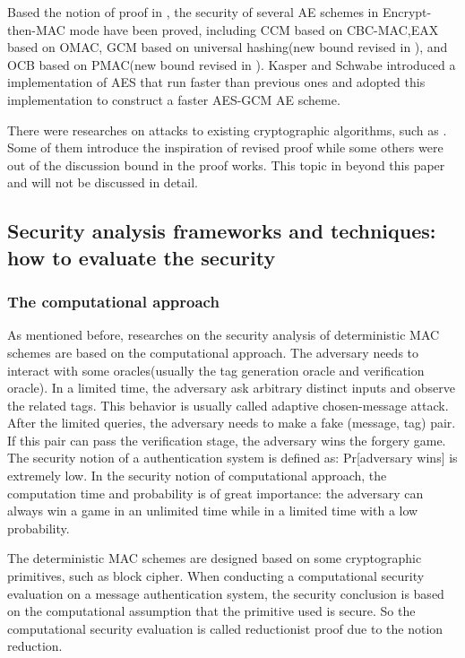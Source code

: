 \documentclass{article}
\begin{document}
Based the notion of proof in \cite{aead}, the security of several AE schemes in
Encrypt-then-MAC mode have been proved, including CCM \cite{ccm}based on
CBC-MAC,EAX\cite{eax} based on OMAC, GCM
\cite{gcm} based on universal hashing(new bound revised in \cite{breaking}), and
OCB\cite{ocb} based on PMAC(new bound revised in \cite{tweak,iPMAC}). Kasper and
Schwabe introduced a implementation of AES that run faster than previous ones
and adopted this implementation to construct a faster AES-GCM AE
scheme\cite{fast}.

There were researches on attacks to existing cryptographic algorithms, such as
\cite{cycle,attack_blk,hardware_attack}. Some of them introduce the inspiration of revised proof while
some others were out of the discussion bound in the proof works. This topic in
beyond this paper and will not be discussed in detail.

\subsection{Security analysis frameworks and techniques: how to evaluate the security}
\subsubsection{The computational approach}
As mentioned before, researches on the security analysis of deterministic MAC schemes are based on the computational approach.
The adversary needs to interact with some oracles(usually the tag generation oracle and verification oracle). In a limited time, the adversary ask arbitrary distinct inputs and observe the related tags. This behavior is usually called adaptive chosen-message attack. After the limited queries, the adversary needs to make a fake (message, tag) pair. If this pair can pass the verification stage, the adversary wins the forgery game. The security notion of a authentication system is defined as: Pr[adversary wins] is extremely low.  In the security notion of computational approach, the computation time and probability is of great importance: the adversary can always win a game in an unlimited time while in a limited time with a low probability. 

The deterministic MAC schemes are designed based on some cryptographic primitives, such as block cipher. When conducting a computational security evaluation on a message authentication system, the security conclusion is based on the computational assumption that the primitive used is secure. So the computational security evaluation is called reductionist proof due to the notion reduction.
\end{document}
